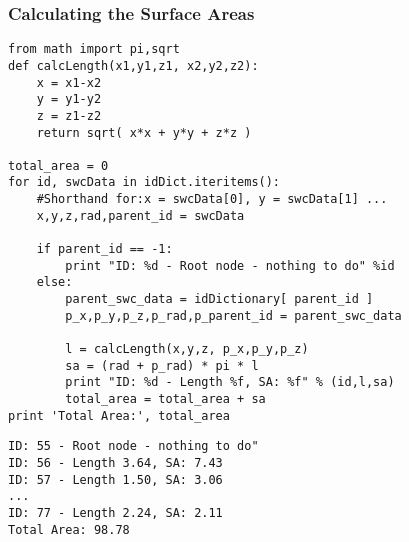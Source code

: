 \documentclass{beamer}
\begin{document}
\begin{frame}[fragile]
	\frametitle{Calculating the Surface Areas}
	\tiny

\begin{verbatim}
from math import pi,sqrt
def calcLength(x1,y1,z1, x2,y2,z2):
    x = x1-x2
    y = y1-y2
    z = z1-z2
    return sqrt( x*x + y*y + z*z )

total_area = 0
for id, swcData in idDict.iteritems():
    #Shorthand for:x = swcData[0], y = swcData[1] ...
    x,y,z,rad,parent_id = swcData

    if parent_id == -1:
        print "ID: %d - Root node - nothing to do" %id
    else:
        parent_swc_data = idDictionary[ parent_id ]
        p_x,p_y,p_z,p_rad,p_parent_id = parent_swc_data
    
        l = calcLength(x,y,z, p_x,p_y,p_z)
        sa = (rad + p_rad) * pi * l
        print "ID: %d - Length %f, SA: %f" % (id,l,sa)    
        total_area = total_area + sa
print 'Total Area:', total_area \end{verbatim}

\begin{verbatim}ID: 55 - Root node - nothing to do"
ID: 56 - Length 3.64, SA: 7.43                                                                   
ID: 57 - Length 1.50, SA: 3.06                                                                   
...
ID: 77 - Length 2.24, SA: 2.11
Total Area: 98.78
\end{verbatim}
\end{frame}
\end{document}
